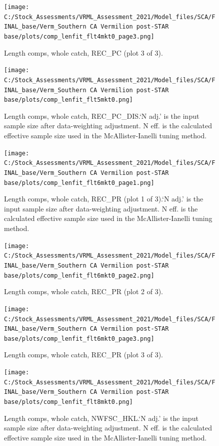 \documentclass[11pt,
  english,
]{article}
\begin{document}
\begin{figure}
\centering
\texttt{[image: C:/Stock\_Assessments/VRML\_Assessment\_2021/Model\_files/SCA/FINAL\_base/Verm\_Southern CA Vermilion post-STAR base/plots/comp\_lenfit\_flt4mkt0\_page3.png]}
\caption{Length comps, whole catch, REC\_PC (plot 3 of 3).\label{fig:comp_lenfit_flt4mkt0_page3}}
\end{figure}

\begin{figure}
\centering
\texttt{[image: C:/Stock\_Assessments/VRML\_Assessment\_2021/Model\_files/SCA/FINAL\_base/Verm\_Southern CA Vermilion post-STAR base/plots/comp\_lenfit\_flt5mkt0.png]}
\caption{Length comps, whole catch, REC\_PC\_DIS.`N adj.' is the input sample size after data-weighting adjustment. N eff. is the calculated effective sample size used in the McAllister-Ianelli tuning method.\label{fig:comp_lenfit_flt5mkt0}}
\end{figure}

\begin{figure}
\centering
\texttt{[image: C:/Stock\_Assessments/VRML\_Assessment\_2021/Model\_files/SCA/FINAL\_base/Verm\_Southern CA Vermilion post-STAR base/plots/comp\_lenfit\_flt6mkt0\_page1.png]}
\caption{Length comps, whole catch, REC\_PR (plot 1 of 3).`N adj.' is the input sample size after data-weighting adjustment. N eff. is the calculated effective sample size used in the McAllister-Ianelli tuning method.\label{fig:comp_lenfit_flt6mkt0_page1}}
\end{figure}

\begin{figure}
\centering
\texttt{[image: C:/Stock\_Assessments/VRML\_Assessment\_2021/Model\_files/SCA/FINAL\_base/Verm\_Southern CA Vermilion post-STAR base/plots/comp\_lenfit\_flt6mkt0\_page2.png]}
\caption{Length comps, whole catch, REC\_PR (plot 2 of 3).\label{fig:comp_lenfit_flt6mkt0_page2}}
\end{figure}

\begin{figure}
\centering
\texttt{[image: C:/Stock\_Assessments/VRML\_Assessment\_2021/Model\_files/SCA/FINAL\_base/Verm\_Southern CA Vermilion post-STAR base/plots/comp\_lenfit\_flt6mkt0\_page3.png]}
\caption{Length comps, whole catch, REC\_PR (plot 3 of 3).\label{fig:comp_lenfit_flt6mkt0_page3}}
\end{figure}

\begin{figure}
\centering
\texttt{[image: C:/Stock\_Assessments/VRML\_Assessment\_2021/Model\_files/SCA/FINAL\_base/Verm\_Southern CA Vermilion post-STAR base/plots/comp\_lenfit\_flt8mkt0.png]}
\caption{Length comps, whole catch, NWFSC\_HKL.`N adj.' is the input sample size after data-weighting adjustment. N eff. is the calculated effective sample size used in the McAllister-Ianelli tuning method.\label{fig:comp_lenfit_flt8mkt0}}
\end{figure}
\end{document}
